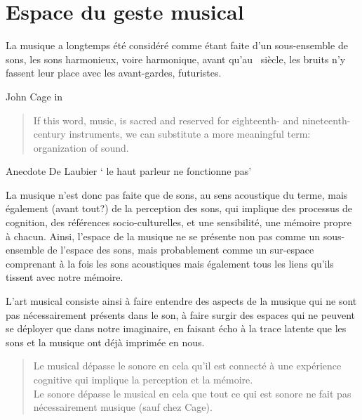 \section*{Espace du geste musical}
La musique a longtemps été considéré comme étant faite d'un sous-ensemble de sons, les sons harmonieux, voire harmonique, avant qu'au ~siècle, les bruits n'y fassent leur place avec les avant-gardes, futuristes. 

John Cage in \cite{cage_silence:_1961}
\begin{quotation}
\noindent If this word, music, is sacred and reserved for eighteenth- and nineteenth-century instruments, we can substitute a more meaningful term: organization of sound.\\
\end{quotation}


Anecdote De Laubier ` le haut parleur ne fonctionne pas'

La musique n'est donc pas faite que de sons, au sens acoustique du terme, mais également (avant tout?) de la perception des sons, qui implique des processus de cognition, des références socio-culturelles, et une sensibilité, une mémoire propre à chacun. 
Ainsi, l'espace de la musique ne se présente non pas comme un sous-ensemble de l'espace des sons, mais probablement comme un sur-espace comprenant à la fois les sons acoustiques mais également tous les liens qu'ils tissent avec notre mémoire.


L'art musical consiste ainsi à faire entendre des aspects de la musique qui ne sont pas nécessairement présents dans le son, à faire surgir des espaces qui ne peuvent se déployer que dans notre imaginaire, en faisant écho à la trace latente que les sons et la musique ont déjà imprimée en nous.


\begin{quotation}
\noindent Le musical dépasse le sonore en cela qu’il est connecté à une expérience cognitive qui implique la perception et la mémoire.\\
Le sonore dépasse le musical en cela que tout ce qui est sonore ne fait pas nécessairement musique (sauf chez Cage).
\end{quotation}

